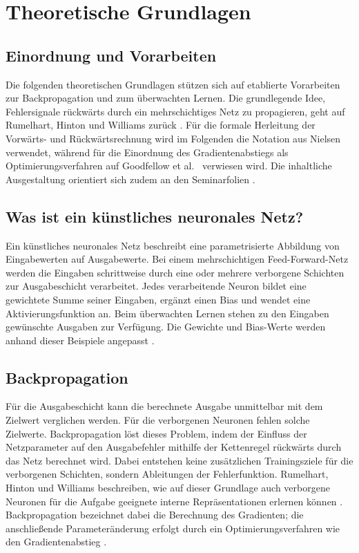 \section{Theoretische Grundlagen}
\label{sec:theorie}

\subsection{Einordnung und Vorarbeiten}
Die folgenden theoretischen Grundlagen stützen sich auf etablierte Vorarbeiten zur Backpropagation und zum überwachten Lernen. Die grundlegende Idee, Fehlersignale rückwärts durch ein mehrschichtiges Netz zu propagieren, geht auf Rumelhart, Hinton und Williams zurück \parencite{rumelhart1986}. Für die formale Herleitung der Vorwärts- und Rückwärtsrechnung wird im Folgenden die Notation aus Nielsen \parencite{nielsen2015} verwendet, während für die Einordnung des Gradientenabstiegs als Optimierungsverfahren auf Goodfellow et al.\ \parencite{goodfellow2016} verwiesen wird. Die inhaltliche Ausgestaltung orientiert sich zudem an den Seminarfolien \parencite{vieten_sw03}.

\subsection{Was ist ein künstliches neuronales Netz?}

Ein künstliches neuronales Netz beschreibt eine parametrisierte Abbildung von
Eingabewerten auf Ausgabewerte. Bei einem mehrschichtigen Feed-Forward-Netz
werden die Eingaben schrittweise durch eine oder mehrere verborgene Schichten
zur Ausgabeschicht verarbeitet. Jedes verarbeitende Neuron bildet eine gewichtete
Summe seiner Eingaben, ergänzt einen Bias und wendet eine Aktivierungsfunktion
an. Beim überwachten Lernen stehen zu den Eingaben gewünschte Ausgaben zur
Verfügung. Die Gewichte und Bias-Werte werden anhand dieser Beispiele
angepasst \parencite[Folien~4 und~6]{vieten_sw03}.

\subsection{Backpropagation}
\label{sec:backpropagation}

Für die Ausgabeschicht kann die berechnete Ausgabe unmittelbar mit dem
Zielwert verglichen werden. Für die verborgenen Neuronen fehlen solche
Zielwerte. Backpropagation löst dieses Problem, indem der Einfluss der
Netzparameter auf den Ausgabefehler mithilfe der Kettenregel rückwärts durch
das Netz berechnet wird. Dabei entstehen keine zusätzlichen Trainingsziele
für die verborgenen Schichten, sondern Ableitungen der Fehlerfunktion.
Rumelhart, Hinton und Williams beschreiben, wie auf dieser Grundlage auch
verborgene Neuronen für die Aufgabe geeignete interne Repräsentationen
erlernen können \parencite{rumelhart1986}. Backpropagation bezeichnet dabei
die Berechnung des Gradienten; die anschließende Parameteränderung erfolgt
durch ein Optimierungsverfahren wie den Gradientenabstieg
\parencite[Abschn.~6.5]{goodfellow2016}.

